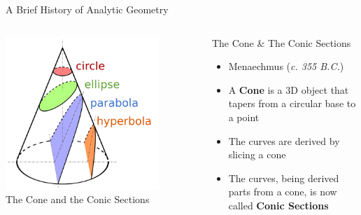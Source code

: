 \documentclass[14pt,aspectratio=169]{beamer}
\begin{document}
\begin{frame}{A Brief History of Analytic Geometry}
    \begin{columns}
     \centering
     \includegraphics[width=0.8\textwidth]{image04.png} \\
     The Cone and the Conic Sections
     \begin{block}{The Cone \& The Conic Sections}
        \vspace{1mm}
        \begin{itemize}
         \item Menaechmus (\textit{c. 355 B.C.})
         \item A \textbf{Cone} is a 3D object that tapers from a circular base to a point
         \item The curves are derived by slicing a cone
         \item The curves, being derived parts from a cone, is now called \textbf{Conic Sections}
        \end{itemize}
        \vspace{1mm}


     \end{block}

    \end{columns}

\end{frame}
\end{document}
